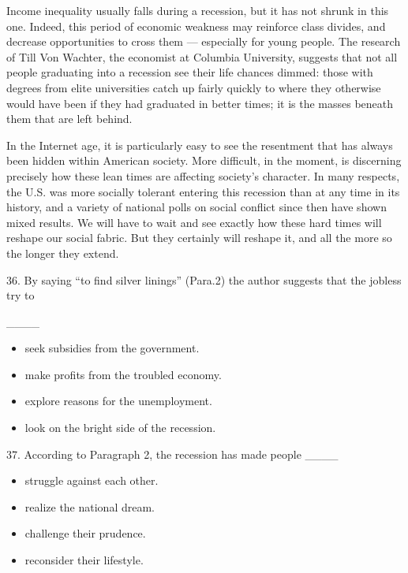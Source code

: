 \documentclass[UTF8,11pt]{ctexart}
\begin{document}
Income inequality usually falls during a recession, but it has not shrunk in this one. Indeed, this period of economic weakness may reinforce class divides, and decrease opportunities to cross them — especially for young people. The research of Till Von Wachter, the economist at Columbia University, suggests that not all people graduating into a recession see their life chances dimmed: those with degrees from elite universities catch up fairly quickly to where they otherwise would have been if they had graduated in better times; it is the masses beneath them that are left behind.


In the Internet age, it is particularly easy to see the resentment that has always been hidden within American society. More difficult, in the moment, is discerning precisely how these lean times are affecting society’s character. In many respects, the U.S. was more socially tolerant entering this recession than at any time in its history, and a variety of national polls on social conflict since then have shown mixed results. We will have to wait and see exactly how these hard times will reshape our social fabric. But they certainly will reshape it, and all the more so the longer they extend.


36. By saying “to find silver linings” (Para.2) the author suggests that the jobless try to


\_\_\_\_


\begin{itemize}[leftmargin=2em,itemsep=.2em,topsep=.4em]\item[A.] seek subsidies from the government.
\item[B.] make profits from the troubled economy.
\item[C.] explore reasons for the unemployment.
\item[D.] look on the bright side of the recession.
\end{itemize}

37. According to Paragraph 2, the recession has made people \_\_\_\_


\begin{itemize}[leftmargin=2em,itemsep=.2em,topsep=.4em]\item[A.] struggle against each other.
\item[B.] realize the national dream.
\item[C.] challenge their prudence.
\item[D.] reconsider their lifestyle.
\end{itemize}
\end{document}
